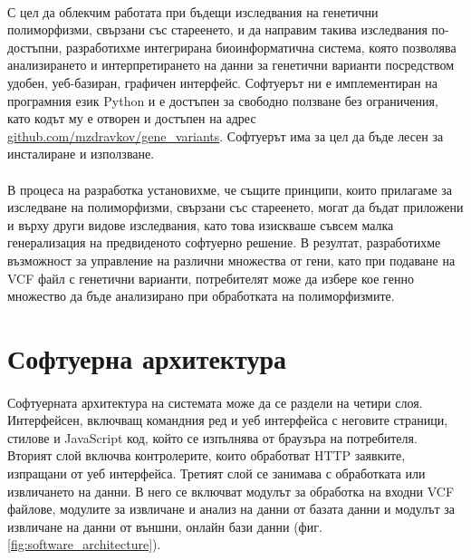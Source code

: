 \documentclass[pdftex,cyrillic,14pt,a4page,twoside,openright]{extreport}
\begin{document}
\paragraph{}
С цел да облекчим работата при бъдещи изследвания на генетични полиморфизми, свързани със стареенето, и да направим такива изследвания по-достъпни, разработихме интегрирана биоинформатична система, която позволява анализирането и интерпретирането на данни за генетични варианти посредством удобен, уеб-базиран, графичен интерфейс. Софтуерът ни е имплементиран на програмния език Python и е достъпен за свободно ползване без ограничения, като кодът му е отворен и достъпен на адрес \url{github.com/mzdravkov/gene_variants}. Софтуерът има за цел да бъде лесен за инсталиране и използване.

\paragraph{}
В процеса на разработка установихме, че същите принципи, които прилагаме за изследване на полиморфизми, свързани със стареенето, могат да бъдат приложени и върху други видове изследвания, като това изискваше съвсем малка генерализация на предвиденото софтуерно решение. В резултат, разработихме възможност за управление на различни множества от гени, като при подаване на VCF файл с генетични варианти, потребителят може да избере кое генно множество да бъде анализирано при обработката на полиморфизмите.

\section{Софтуерна архитектура}
\paragraph{}
Софтуерната архитектура на системата може да се раздели на четири слоя. Интерфейсен, включващ командния ред и уеб интерфейса с неговите страници, стилове и JavaScript код, който се изпълнява от браузъра на потребителя. Вторият слой включва контролерите, които обработват HTTP заявките, изпращани от уеб интерфейса. Третият слой се занимава с обработката или извличането на данни. В него се включват модулът за обработка на входни VCF файлове, модулите за извличане и анализ на данни от базата данни и модулът за извличане на данни от външни, онлайн бази данни (фиг. \ref{fig:software_architecture}).
\end{document}

